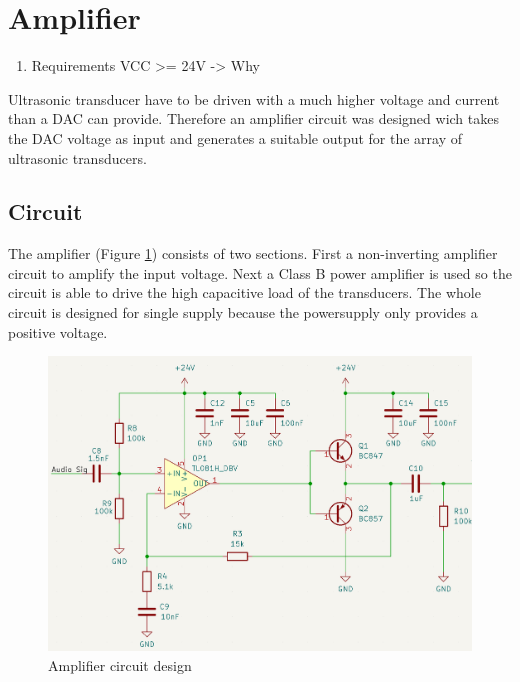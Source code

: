 \section{Amplifier}\label{sec:pcb:amp}

\begin{enumerate}
  \item Requirements
  \subitem VCC >= 24V -> Why
\end{enumerate}

Ultrasonic transducer have to be driven with a much higher voltage and current than a DAC can provide. Therefore an amplifier circuit was designed wich takes the DAC voltage as input and generates a suitable output for the array of ultrasonic transducers.

\subsection{Circuit}

The amplifier (Figure \ref{fig:pcb:amp_circuit}) consists of two sections. First a non-inverting amplifier circuit to amplify the input voltage. Next a Class B power amplifier is used so the circuit is able to drive the high capacitive load of the transducers. The whole circuit is designed for single supply because the powersupply only provides a positive voltage.

\begin{figure}
  \centering
  \includegraphics[height=\largeheight]{src/assets/pictures/circuit/amp_circuit.png}
  \caption{Amplifier circuit design}\label{fig:pcb:amp_circuit}
\end{figure}

